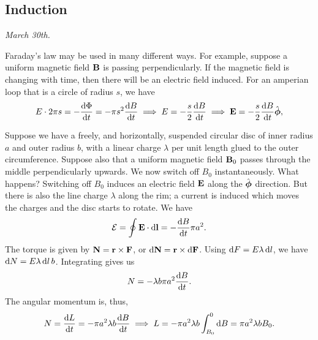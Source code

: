 \subsection{Induction}

\noindent \textit{March 30th.}

Faraday's law may be used in many different ways. For example, suppose a uniform magnetic field $\mathbf{B}$ is passing perpendicularly. If the magnetic field is changing with time, then there will be an electric field induced. For an amperian loop that is a circle of radius $s$, we have
\begin{align}
    E \cdot 2 \pi s = - \frac{\mathrm{d}\Phi}{\mathrm{d}t} = -\pi s^{2} \frac{\mathrm{d}B}{\mathrm{d}t} \implies E = -\frac{s}{2} \frac{\mathrm{d}B}{\mathrm{d}t} \implies \mathbf{E} = -\frac{s}{2} \frac{\mathrm{d}B}{\mathrm{d}t} \hat{\boldsymbol{\phi}},
\end{align}

Suppose we have a freely, and horizontally, suspended circular disc of inner radius $a$ and outer radius $b$, with a linear charge $\lambda$ per unit length glued to the outer circumference. Suppose also that a uniform magnetic field $\mathbf{B}_{0}$ passes through the middle perpendicularly upwards. We now switch off $B_{0}$ instantaneously. What happens? Switching off $B_{0}$ induces an electric field $\mathbf{E}$ along the $\hat{\boldsymbol{\phi}}$ direction. But there is also the line charge $\lambda$ along the rim; a current is induced which moves the charges and the disc starts to rotate. We have
\begin{align}
    \mathcal{E} = \oint \mathbf{E} \cdot \mathrm{d}\mathbf{l} = -\frac{\mathrm{d}B}{\mathrm{d}t} \pi a^{2}.
\end{align}
The torque is given by $\mathbf{N} = \mathbf{r} \times \mathbf{F}$, or $\mathrm{d}\mathbf{N} = \mathbf{r} \times \mathrm{d}\mathbf{F}$. Using $\mathrm{d}F = E \lambda \, \mathrm{d}l$, we have $\mathrm{d}N = E \lambda \, \mathrm{d}l \, b$. Integrating gives us
\begin{align}
    N = -\lambda b \pi a^{2} \frac{\mathrm{d}B}{\mathrm{d}t}.
\end{align}
The angular momentum is, thus,
\begin{align}
    N = \frac{\mathrm{d}L}{\mathrm{d}t} = - \pi a^{2} \lambda b \frac{\mathrm{d}B}{\mathrm{d}t} \implies L = -\pi a^{2} \lambda b \int_{B_{0}}^{0} \mathrm{d}B = \pi a^{2} \lambda b B_{0}.
\end{align}

